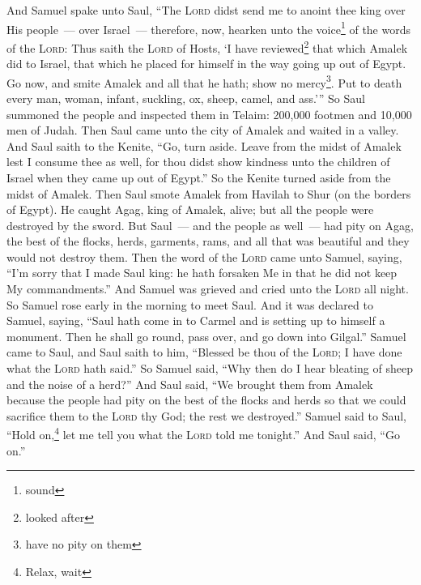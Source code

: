 
\begin{inparaenum}
     And Samuel spake unto Saul, ``The \textsc{Lord} didst send me to anoint thee king over His people~--- over Israel~--- therefore, now, hearken unto the voice\footnote{sound} of the words of the \textsc{Lord}:%
     Thus saith the \textsc{Lord} of Hosts, `I have reviewed\footnote{looked after} that which Amalek did to Israel, that which he placed for himself in the way going up out of Egypt.%
     Go now, and smite Amalek and all that he hath; show no mercy\footnote{have no pity on them}. Put to death every man, woman, infant, suckling, ox, sheep, camel, and ass.'''%
     So Saul summoned the people and inspected them in Telaim: 200,000 footmen and 10,000 men of Judah.%
     Then Saul came unto the city of Amalek and waited in a valley.%
     And Saul saith to the Kenite, ``Go, turn aside. Leave from the midst of Amalek lest I consume thee as well, for thou didst show kindness unto the children of Israel when they came up out of Egypt.'' So the Kenite turned aside from the midst of Amalek.%
     Then Saul smote Amalek from Havilah to Shur (on the borders of Egypt).%
     He caught Agag, king of Amalek, alive; but all the people were destroyed by the sword.%
     But Saul~--- and the people as well~--- had pity on Agag, the best of the flocks, herds, garments, rams, and all that was beautiful and they would not destroy them.%
     Then the word of the \textsc{Lord} came unto Samuel, saying,%
     ``I'm sorry that I made Saul king: he hath forsaken Me in that he did not keep My commandments.'' And Samuel was grieved and cried unto the \textsc{Lord} all night.%
     So Samuel rose early in the morning to meet Saul. And it was declared to Samuel, saying, ``Saul hath come in to Carmel and is setting up to himself a monument. Then he shall go round, pass over, and go down into Gilgal.''%
     Samuel came to Saul, and Saul saith to him, ``Blessed be thou of the \textsc{Lord}; I have done what the \textsc{Lord} hath said.''%
     So Samuel said, ``Why then do I hear bleating of sheep and the noise of a herd?''%
     And Saul said, ``We brought them from Amalek because the people had pity on the best of the flocks and herds so that we could sacrifice them to the \textsc{Lord} thy God; the rest we destroyed.''%
     Samuel said to Saul, ``Hold on,\footnote{Relax, wait} let me tell you what the \textsc{Lord} told me tonight.'' And Saul said, ``Go on.''%

\end{inparaenum}
